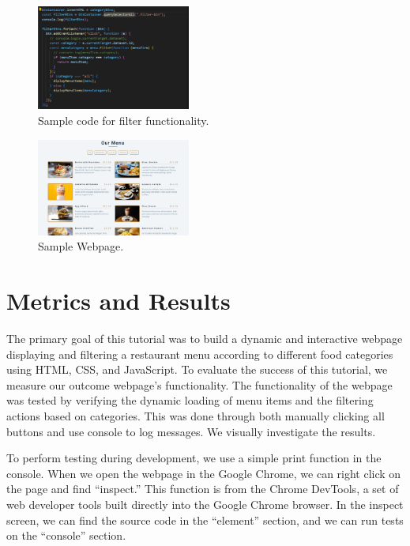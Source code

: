 \documentclass[10pt,twocolumn]{article}
\begin{document}
  \begin{figure}[h]
  \centering
  \includegraphics[width=0.45\textwidth]{Filter.jpg}
  \caption{Sample code for filter functionality.}
  \label{fig:image1}
\end{figure}

  \begin{figure}[h]
  \centering
  \includegraphics[width=0.45\textwidth]{Webpage.jpg}
  \caption{Sample Webpage.}
  \label{fig:image1}
\end{figure}



\section{Metrics and Results}

The primary goal of this tutorial was to build a dynamic and interactive webpage displaying and filtering a restaurant menu according to different food categories using HTML, CSS, and JavaScript. To evaluate the success of this tutorial, we measure our outcome webpage’s functionality.
The functionality of the webpage was tested by verifying the dynamic loading of menu items and the filtering actions based on categories. This was done through both manually clicking all buttons and use console to log messages. We visually investigate the results. 

To perform testing during development, we use a simple print function in the console. When we open the webpage in the Google Chrome, we can right click on the page and find “inspect.” This function is from the Chrome DevTools, a set of web developer tools built directly into the Google Chrome browser. In the inspect screen, we can find the source code in the “element” section, and we can run tests on the “console” section. 
\end{document}

